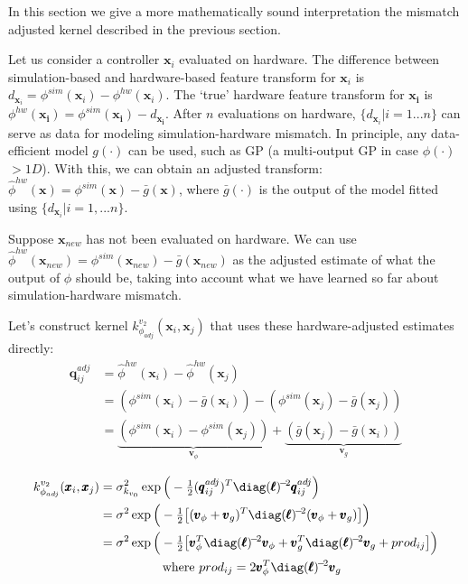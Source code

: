 In this section we give a more mathematically sound interpretation the mismatch adjusted kernel described in the previous section.

Let us consider a controller $\pmb{x}_i$ evaluated on hardware. The difference between simulation-based and hardware-based feature transform for $\pmb{x}_i$ is $d_{\pmb{x}_i} = \phi^{sim}(\pmb{x}_i) - \phi^{hw}(\pmb{x}_i)$. The `true' hardware feature transform for $\pmb{x_i}$ is $\phi^{hw}(\pmb{x_i}) = \phi^{sim}(\pmb{x_i}) - d_{\pmb{x_i}}$. After $n$ evaluations on hardware, $\{ d_{\pmb{x}_i} | i=1...n \}$ can serve as data for modeling simulation-hardware mismatch. In principle, any data-efficient model $g(\cdot)$ can be used, such as GP (a multi-output GP in case $\phi(\cdot)$ $>1D$). With this, we can obtain an adjusted transform: $\hat{\phi}^{hw}(\pmb{x}) = \phi^{sim}(\pmb{x}) - \bar{g}(\pmb{x})$, where $\bar{g}(\cdot)$ is the output of the model fitted using $\{d_{\pmb{x}_i} | i=1,...n \}$.

Suppose $\pmb{x}_{new}$ has not been evaluated on hardware. We can use $\hat{\phi}^{hw}(\pmb{x}_{new}) = \phi^{sim}(\pmb{x}_{new}) - \bar{g}(\pmb{x}_{new})$ as the adjusted estimate of what the output of $\phi$ should be, taking into account what we have learned so far about simulation-hardware mismatch.

Let's construct kernel $k^{v_2}_{\phi_{adj}}(\pmb{x}_i, \pmb{x}_j)$ that uses these hardware-adjusted estimates directly:
\begin{equation*}
\begin{split}
\pmb{q}_{ij}^{adj} &= \hat{\phi}^{hw}(\pmb{x}_{i}) - \hat{\phi}^{hw}(\pmb{x}_{j}) \\
&= (\phi^{sim}(\pmb{x}_{i}) - \bar{g}(\pmb{x}_i)) - (\phi^{sim}(\pmb{x}_{j}) - \bar{g}(\pmb{x}_j) ) \\
&= \underbrace{(\phi^{sim}(\pmb{x}_{i}) - \phi^{sim}(\pmb{x}_{j}))}_{\pmb{v}_{\phi}} + \underbrace{(\bar{g}(\pmb{x}_j) - \bar{g}(\pmb{x}_i) )}_{\pmb{v}_{g}}
\end{split}
\end{equation*}

\begin{equation*}
\begin{split}
k^{v_2}_{\phi_{adj}}(\pmb{x}_i, \pmb{x}_j) &= \sigma^2_{k_{v_0}} \exp\Big(- \tfrac{1}{2} (\pmb{q}_{ij}^{adj})^T \diag(\pmb{\ell})^{\!-\!2} \pmb{q}_{ij}^{adj} \Big) \\
& = \sigma^2 \exp\Big(- \tfrac{1}{2} \big[ (\pmb{v}_{\phi} + \pmb{v}_{g})^T \diag(\pmb{\ell})^{\!-\!2} (\pmb{v}_{\phi} + \pmb{v}_{g}) \big] \Big) \\
& = \sigma^2
\exp\Big(- \tfrac{1}{2} \big[ \pmb{v}_{\phi}^T \diag(\pmb{\ell})^{\!-\!2} \pmb{v}_{\phi} + \pmb{v}_{g}^T\diag(\pmb{\ell})^{\!-\!2} \pmb{v}_{g} + prod_{ij} \big] \Big)\\
&\quad \quad \quad \quad \quad \text{where } prod_{ij} = 2 \pmb{v}_{\phi}^T\diag(\pmb{\ell})^{\!-\!2} \pmb{v}_{g}
\end{split}
\end{equation*}


